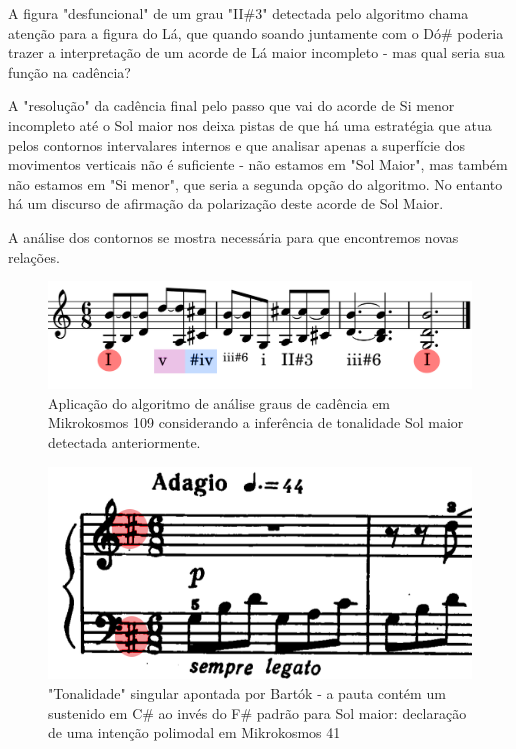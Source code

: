 \documentclass[
	12pt,				%
	openright,			%
	twoside,			%
	a4paper,			%
	english,			%
	french,				%
	spanish,			%
	brazil				%
	]{abntex2}
\begin{document}
A figura "desfuncional" de um grau "II\#3" detectada pelo algoritmo chama atenção para a figura do Lá, que quando soando juntamente com o Dó\# poderia trazer a interpretação de um acorde de Lá maior incompleto - mas qual seria sua função na cadência? 

A "resolução" da cadência final pelo passo que vai do acorde de Si menor incompleto até o Sol maior nos deixa pistas de que há uma estratégia que atua pelos contornos intervalares internos e que analisar apenas a superfície dos movimentos verticais não é suficiente - não estamos em "Sol Maior", mas também não estamos em "Si menor", que seria a segunda opção do algoritmo. No entanto há um discurso de afirmação da polarização deste acorde de Sol Maior.

A análise dos contornos se mostra necessária para que encontremos novas relações. 

\begin{figure}[!h]
	\caption{\label{fig_grafico} Aplicação do algoritmo de análise graus de cadência em Mikrokosmos 109 considerando a inferência de tonalidade Sol maior detectada anteriormente.} 
	\begin{center}
	    \includegraphics[scale=0.25]{estudosM21/mikro041FinalChords.png}
	\end{center}
\end{figure}



\begin{figure}[!h]
	\caption{\label{fig_grafico} "Tonalidade" singular apontada por Bartók - a pauta contém um sustenido em C\# ao invés do F\# padrão para Sol maior: declaração de uma intenção polimodal em Mikrokosmos 41} 
	\begin{center}
	    \includegraphics[scale=0.4]{estudosM21/mikro041_inicio.png}
	\end{center}
\end{figure}
\end{document}
